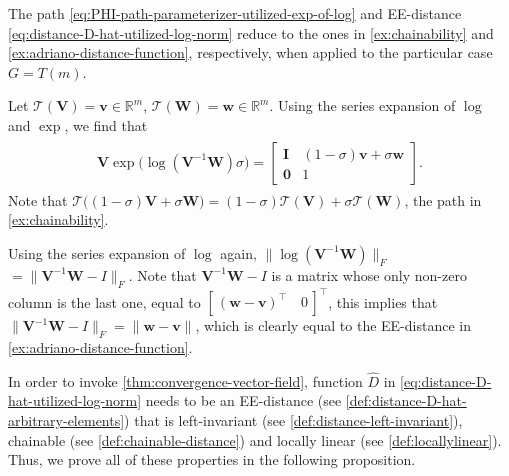 \begin{remark}
    The path \eqref{eq:PHI-path-parameterizer-utilized-exp-of-log} and EE-distance \eqref{eq:distance-D-hat-utilized-log-norm} reduce to the ones in \cref{ex:chainability} and \cref{ex:adriano-distance-function}, respectively, when applied to the particular case $G=T(m)$.

    Let $\mathcal{T}(\mathbf{V}) = \mathbf{v}\in\mathbb{R}^m$, $\mathcal{T}(\mathbf{W}) = \mathbf{w}\in\mathbb{R}^m$. Using the series expansion of $\log$ and $\exp$, we find that
    \begin{align}
    \begin{split}
        \mathbf{V}\exp{\bigl(\log{(\mathbf{V}^{-1}\mathbf{W})}\sigma\bigr)} 
        = \begin{bmatrix}
            \mathbf{I} & (1 - \sigma)\mathbf{v} + \sigma \mathbf{w}\\ \mathbf{0} & 1
        \end{bmatrix}.
        \end{split}
    \end{align}
    Note that $\mathcal{T}\bigl((1 - \sigma)\mathbf{V} + \sigma\mathbf{W}\bigr) = (1 - \sigma)\mathcal{T}(\mathbf{V}) + \sigma \mathcal{T}(\mathbf{W})$, the path in \cref{ex:chainability}.

    Using the series expansion of $\log$ again, $\|\log{(\mathbf{V}^{-1}\mathbf{W})}\|_F$
    $= \|\mathbf{V}^{-1}\mathbf{W} - I\|_F$. Note that $\mathbf{V}^{-1}\mathbf{W} - I$ is a matrix whose only non-zero column is the last one, equal to $[\,(\mathbf{w} - \mathbf{v})^\top\quad 0\,]^\top$, this implies that $\|\mathbf{V}^{-1}\mathbf{W} - I\|_F$$=\|\mathbf{w}-\mathbf{v}\|$, which is clearly equal to the EE-distance in \cref{ex:adriano-distance-function}. 
\end{remark}

In order to invoke \cref{thm:convergence-vector-field}, function $\widehat{D}$ in \eqref{eq:distance-D-hat-utilized-log-norm} needs to be an EE-distance (see \cref{def:distance-D-hat-arbitrary-elements}) that is left-invariant (see \cref{def:distance-left-invariant}), chainable (see \cref{def:chainable-distance}) and locally linear (see \cref{def:locallylinear}). Thus, we prove all of these properties in the following proposition.

